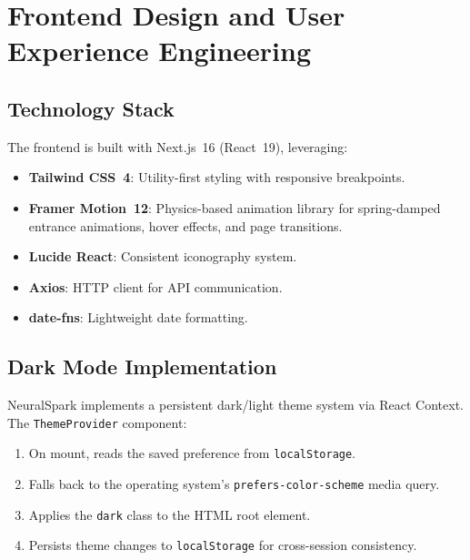 \documentclass[conference]{IEEEtran}
\begin{document}
\section{Frontend Design and User Experience Engineering}

\subsection{Technology Stack}
The frontend is built with Next.js~16 (React~19), leveraging:
\begin{itemize}[leftmargin=*]
    \item \textbf{Tailwind CSS~4}: Utility-first styling with responsive breakpoints.
    \item \textbf{Framer Motion~12}: Physics-based animation library for spring-damped entrance animations, hover effects, and page transitions.
    \item \textbf{Lucide React}: Consistent iconography system.
    \item \textbf{Axios}: HTTP client for API communication.
    \item \textbf{date-fns}: Lightweight date formatting.
\end{itemize}

\subsection{Dark Mode Implementation}
NeuralSpark implements a persistent dark/light theme system via React Context. The \texttt{ThemeProvider} component:
\begin{enumerate}[leftmargin=*]
    \item On mount, reads the saved preference from \texttt{localStorage}.
    \item Falls back to the operating system's \texttt{prefers-color-scheme} media query.
    \item Applies the \texttt{dark} class to the HTML root element.
    \item Persists theme changes to \texttt{localStorage} for cross-session consistency.
\end{enumerate}
\end{document}
